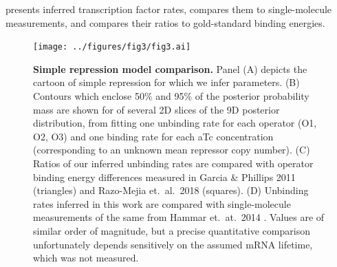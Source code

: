  presents inferred
transcription factor rates, compares them to
single-molecule measurements, and compares their ratios to gold-standard binding
energies.
\begin{figure}%
\centering
\texttt{[image: ../figures/fig3/fig3.ai]}
\caption{\textbf{Simple repression model comparison.}
Panel (A) depicts the cartoon of simple repression for which we infer parameters.
(B) Contours which enclose 50\% and 95\% of the posterior
probability mass are shown for of several 2D slices of
the 9D posterior distribution, from fitting one
unbinding rate for each operator (O1, O2, O3) and one binding rate for each aTc
concentration (corresponding to an unknown mean repressor copy number). (C)
Ratios of our inferred unbinding rates are compared with operator binding energy
differences measured in Garcia \& Phillips 2011 (triangles) and Razo-Mejia et.\
al.\ 2018 (squares). (D) Unbinding rates inferred in this work are compared with
single-molecule measurements of the same from Hammar et.\ at.\ 2014
\mmnote{Johan Elf's group}. Values are of similar order of magnitude, but a
precise quantitative comparison unfortunately depends sensitively on the assumed
mRNA lifetime, which was not measured.}
\label{fig3:kR_inferences}
\end{figure}

